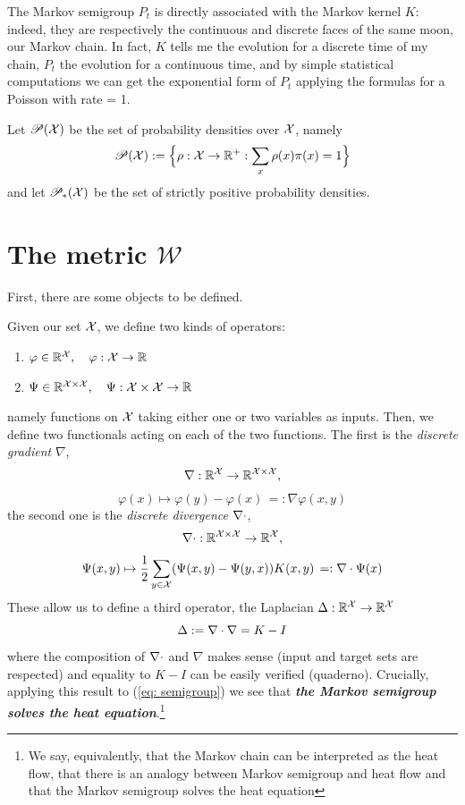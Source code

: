 \begin{remark}
    The Markov semigroup $P_t$ is directly associated with the Markov kernel $K$: indeed, they are respectively the continuous and discrete faces of the same moon, our Markov chain. In fact, $K$ tells me the evolution for a discrete time of my chain, $P_t$ the evolution for a continuous time, and by simple statistical computations we can get the exponential form of $P_t$ applying the formulas for a Poisson with rate = 1. 
\end{remark}

Let $\mathscr{P}(\mathcal{X})$ be the set of probability densities over $\mathcal{X}$, namely
\[
\mathscr{P}(\mathcal{X}):= \Big\{\rho:\mathcal{X}\to\mathbb{R}^+ : \sum_x \rho(x) \pi(x)=1\Big\}
\]
and let $\mathscr{P}_*(\mathcal{X})$ be the set of strictly positive probability densities. 


\section{The metric $\mathcal{W}$}\label{sec: W}
First, there are some objects to be defined. 

Given our set $\mathcal{X}$, we define two kinds of operators:
\begin{enumerate}[label=($\roman*$)]
    \item $\varphi\in\mathbb{R}^{\mathcal{X}}, \quad \varphi: \mathcal{X} \to \mathbb{R}$
    \item $\Psi\in\mathbb{R}^{\mathcal{X}\times\mathcal{X}}, \quad \Psi: \mathcal{X} \times \mathcal{X} \to \mathbb{R}$
\end{enumerate}
namely functions on $\mathcal{X}$ taking either one or two variables as inputs. Then, we define two functionals acting on each of the two functions. The first is the \emph{discrete gradient} $\nabla$,
\[
\nabla: \mathbb{R}^{\mathcal{X}} \to \mathbb{R}^{\mathcal{X} \times \mathcal{X}}, 
\]
\[
\varphi(x) \mapsto \varphi(y)-\varphi(x) \, =: \nabla \varphi(x,y)
\]
the second one is the \emph{discrete divergence} $\nabla \cdot$,
\[
\nabla \cdot:\mathbb{R}^{\mathcal{X} \times \mathcal{X}} \to \mathbb{R}^{\mathcal{X}} , 
\]
\[
\Psi(x,y) \mapsto \frac{1}{2}\sum_{y\in\mathcal{X}}(\Psi(x,y) - \Psi(y,x))K(x,y) \, =: \nabla \cdot \Psi(x)
\]
These allow us to define a third operator, the Laplacian $\Delta:\mathbb{R}^{\mathcal{X}} \to\mathbb{R}^{\mathcal{X}}$
\[
\Delta := \nabla \cdot \nabla = K-I
\]
where the composition of $\nabla \cdot$ and $\nabla$ makes sense (input and target sets are respected) and  equality to $K-I$ can be easily verified (quaderno). Crucially, applying this result to (\ref{eq: semigroup}) we see that \textbf{\textit{the Markov semigroup solves the heat equation}}.\footnote{We say, equivalently, that the Markov chain can be interpreted as the heat flow, that there is an analogy between Markov semigroup and heat flow and that the Markov semigroup solves the heat equation}

